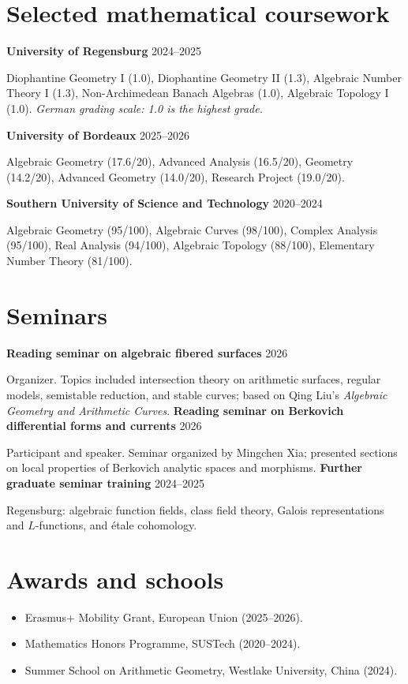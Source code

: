 \documentclass[10pt,letterpaper]{article}
\newcommand{\rightdate}[1]{\hfill{\footnotesize\sffamily\color{muted} #1}}
\newcommand{\entrytitle}[2]{\needspace{3\baselineskip}\textbf{#1}\rightdate{#2}\par}
\newcommand{\indented}[1]{\begin{list}{}{\setlength{\leftmargin}{1.05em}\setlength{\rightmargin}{0em}\setlength{\topsep}{0pt}\setlength{\itemsep}{0pt}\setlength{\parsep}{0pt}}\item #1\end{list}}
\begin{document}
\section*{Selected mathematical coursework}
\entrytitle{University of Regensburg}{2024--2025}
\indented{Diophantine Geometry I (1.0), Diophantine Geometry II (1.3), Algebraic Number Theory I (1.3), Non-Archimedean \mbox{Banach} Algebras (1.0), Algebraic Topology I (1.0). \textit{German grading scale: 1.0 is the highest grade.}}
\vspace{3pt}
\entrytitle{University of Bordeaux}{2025--2026}
\indented{Algebraic Geometry (17.6/20), Advanced Analysis (16.5/20), Geometry (14.2/20), Advanced Geometry (14.0/20), Research Project (19.0/20).}
\vspace{3pt}
\entrytitle{Southern University of Science and Technology}{2020--2024}
\indented{Algebraic Geometry (95/100), Algebraic Curves (98/100), Complex Analysis (95/100), Real Analysis (94/100), Algebraic Topology (88/100), Elementary Number Theory (81/100).}

\section*{Seminars}
\entrytitle{Reading seminar on algebraic fibered surfaces}{2026}
Organizer. Topics included intersection theory on arithmetic surfaces, regular models, semistable reduction, and stable curves; based on Qing Liu's \emph{Algebraic Geometry and Arithmetic Curves}.
\vspace{4pt}
\entrytitle{Reading seminar on Berkovich differential forms and currents}{2026}
Participant and speaker. Seminar organized by Mingchen Xia; presented sections on local properties of Berkovich analytic spaces and morphisms.
\vspace{4pt}
\entrytitle{Further graduate seminar training}{2024--2025}
Regensburg: algebraic function fields, class field theory, Galois representations and $L$-functions, and \'etale cohomology.

\section*{Awards and schools}
\begin{itemize}
\item Erasmus+ Mobility Grant, European Union (2025--2026).
\item Mathematics Honors Programme, SUSTech (2020--2024).
\item Summer School on Arithmetic Geometry, Westlake University, China (2024).
\end{itemize}
\end{document}
